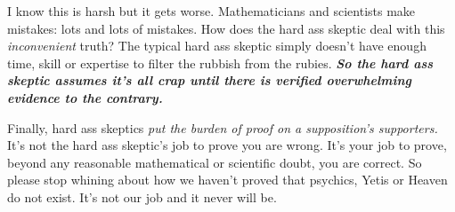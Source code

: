 I know this is harsh but it gets worse. Mathematicians and scientists
make mistakes: lots and lots of mistakes. How does the hard ass skeptic
deal with this \emph{inconvenient} truth? The typical hard ass skeptic
simply doesn't have enough time, skill or expertise to filter the
rubbish from the rubies. \textbf{\emph{So the hard ass skeptic assumes
it's all crap until there is verified overwhelming evidence to the
contrary.}}

Finally, hard ass skeptics \emph{put the burden of proof on a
supposition's supporters.} It's not the hard ass skeptic's job to prove
you are wrong. It's your job to prove, beyond any reasonable
mathematical or scientific doubt, you are correct. So please stop
whining about how we haven't proved that psychics, Yetis or Heaven do
not exist. It's not our job and it never will be.


%